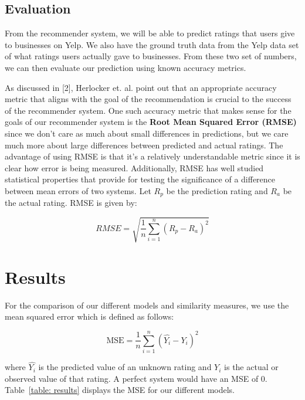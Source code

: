 \documentclass[10pt]{article}
\begin{document}
\subsection{Evaluation}
From the recommender system, we will be able to predict ratings that users give to businesses on Yelp. We also have the ground truth data from the Yelp data set of what ratings users actually gave to businesses. From these two set of numbers, we can then evaluate our prediction using known accuracy metrics. 

As discussed in [2], Herlocker et. al. point out that an appropriate accuracy metric that aligns with the goal of the recommendation is crucial to the success of the recommender system. One such accuracy metric that makes sense for the goals of our recommender system is the \textbf{Root Mean Squared Error (RMSE)} since we don't care as much about small differences in predictions, but we care much more about large differences between predicted and actual ratings. The advantage of using RMSE is that it's a relatively understandable metric since it is clear how error is being measured. Additionally, RMSE has well studied statistical properties that provide for testing the significance of a difference between mean errors of two systems. Let $R_{p}$ be the prediction rating and $R_{a}$ be the actual rating. RMSE is given by: 

$$ RMSE = \sqrt{\frac{1}{n} \sum_{i=1}^{n}(R_{p} - R_{a})^{2}} $$



\section{Results}

For the comparison of our different models and similarity measures, we use the mean squared error which is defined as follows:

$$ \mbox{MSE} = \frac{1}{n}\sum_{i=1}^n(\hat{Y_i} - Y_i)^2
$$

where $\hat{Y_i}$ is the predicted value of an unknown rating and $Y_i$ is the actual or observed value of that rating. A perfect system would have an MSE of 0. Table~\ref{table: results} displays the MSE for our different models.
\end{document}
